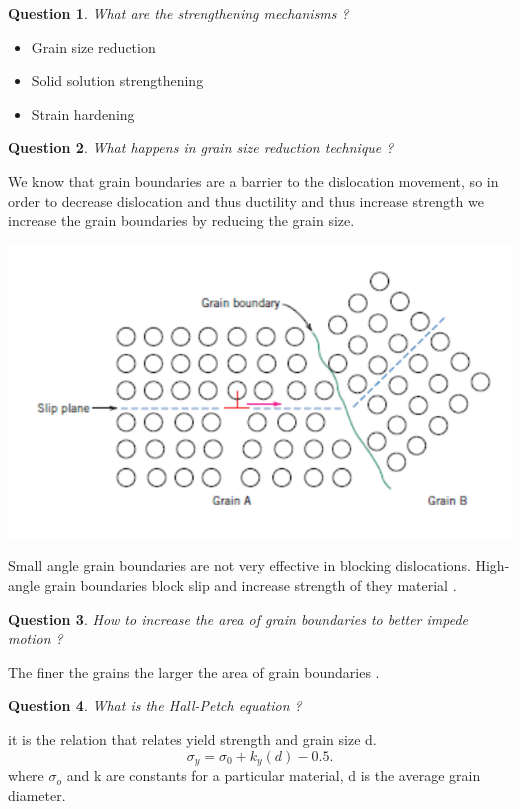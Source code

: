 \documentclass[13]{article}
\newtheorem{exer}{Question}
\begin{document}
\begin{exer}
What are the strengthening mechanisms ?
\end{exer}
\begin{itemize}

\item Grain size reduction
\item Solid solution strengthening 
\item Strain hardening

\end{itemize}
\begin{exer}
What happens in grain size reduction technique ?
\end{exer}
We know that grain boundaries are a barrier to the dislocation movement, so in order to decrease dislocation and thus ductility and thus increase strength we increase the grain boundaries by reducing the grain size.
\begin{center}
\includegraphics[scale=0.5]{figures/18.png}
\end{center}
Small angle grain boundaries are not very effective in blocking dislocations.
High-angle grain boundaries block slip and increase strength of they material
.
\begin{exer}
How to increase the area of grain boundaries to better impede motion ?
\end{exer}
The finer the grains the larger the area of grain boundaries .
\begin{exer}
What is the Hall-Petch equation ?
\end{exer}
it is the relation that relates yield strength and grain size d.
\[
	\sigma_y = \sigma_0 + k_y(d) - 0.5
.\]
where $\sigma_o$ and k are constants for a particular material, d is the average grain diameter.
\end{document}
